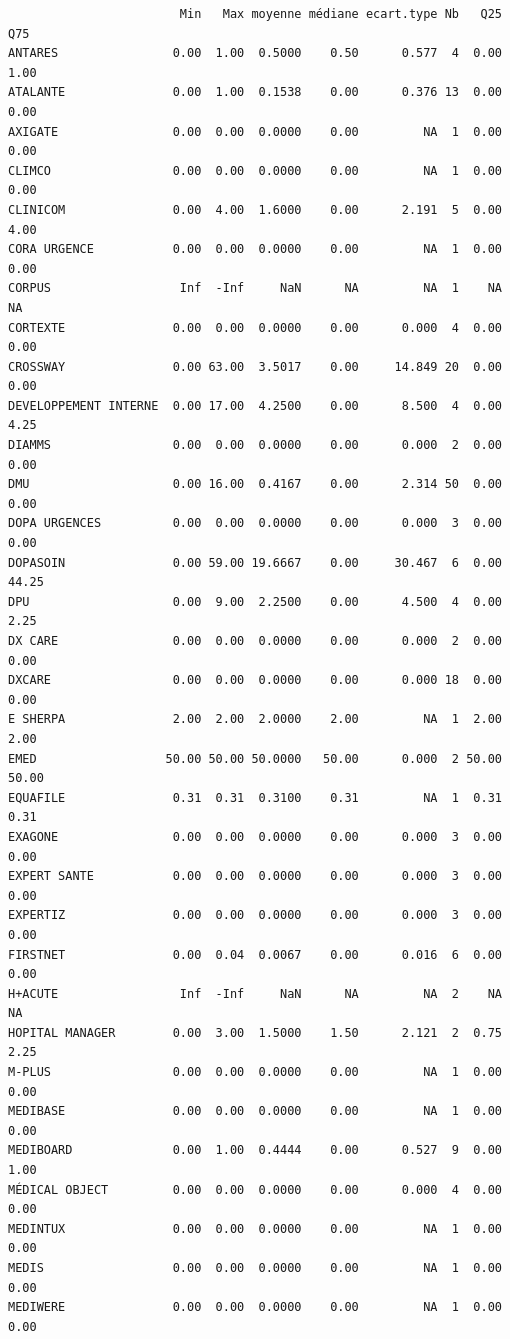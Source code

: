 \documentclass[]{article}
\begin{document}
\begin{verbatim}
                        Min   Max moyenne médiane ecart.type Nb   Q25   Q75
ANTARES                0.00  1.00  0.5000    0.50      0.577  4  0.00  1.00
ATALANTE               0.00  1.00  0.1538    0.00      0.376 13  0.00  0.00
AXIGATE                0.00  0.00  0.0000    0.00         NA  1  0.00  0.00
CLIMCO                 0.00  0.00  0.0000    0.00         NA  1  0.00  0.00
CLINICOM               0.00  4.00  1.6000    0.00      2.191  5  0.00  4.00
CORA URGENCE           0.00  0.00  0.0000    0.00         NA  1  0.00  0.00
CORPUS                  Inf  -Inf     NaN      NA         NA  1    NA    NA
CORTEXTE               0.00  0.00  0.0000    0.00      0.000  4  0.00  0.00
CROSSWAY               0.00 63.00  3.5017    0.00     14.849 20  0.00  0.00
DEVELOPPEMENT INTERNE  0.00 17.00  4.2500    0.00      8.500  4  0.00  4.25
DIAMMS                 0.00  0.00  0.0000    0.00      0.000  2  0.00  0.00
DMU                    0.00 16.00  0.4167    0.00      2.314 50  0.00  0.00
DOPA URGENCES          0.00  0.00  0.0000    0.00      0.000  3  0.00  0.00
DOPASOIN               0.00 59.00 19.6667    0.00     30.467  6  0.00 44.25
DPU                    0.00  9.00  2.2500    0.00      4.500  4  0.00  2.25
DX CARE                0.00  0.00  0.0000    0.00      0.000  2  0.00  0.00
DXCARE                 0.00  0.00  0.0000    0.00      0.000 18  0.00  0.00
E SHERPA               2.00  2.00  2.0000    2.00         NA  1  2.00  2.00
EMED                  50.00 50.00 50.0000   50.00      0.000  2 50.00 50.00
EQUAFILE               0.31  0.31  0.3100    0.31         NA  1  0.31  0.31
EXAGONE                0.00  0.00  0.0000    0.00      0.000  3  0.00  0.00
EXPERT SANTE           0.00  0.00  0.0000    0.00      0.000  3  0.00  0.00
EXPERTIZ               0.00  0.00  0.0000    0.00      0.000  3  0.00  0.00
FIRSTNET               0.00  0.04  0.0067    0.00      0.016  6  0.00  0.00
H+ACUTE                 Inf  -Inf     NaN      NA         NA  2    NA    NA
HOPITAL MANAGER        0.00  3.00  1.5000    1.50      2.121  2  0.75  2.25
M-PLUS                 0.00  0.00  0.0000    0.00         NA  1  0.00  0.00
MEDIBASE               0.00  0.00  0.0000    0.00         NA  1  0.00  0.00
MEDIBOARD              0.00  1.00  0.4444    0.00      0.527  9  0.00  1.00
MÉDICAL OBJECT         0.00  0.00  0.0000    0.00      0.000  4  0.00  0.00
MEDINTUX               0.00  0.00  0.0000    0.00         NA  1  0.00  0.00
MEDIS                  0.00  0.00  0.0000    0.00         NA  1  0.00  0.00
MEDIWERE               0.00  0.00  0.0000    0.00         NA  1  0.00  0.00

\end{verbatim}
\end{document}

